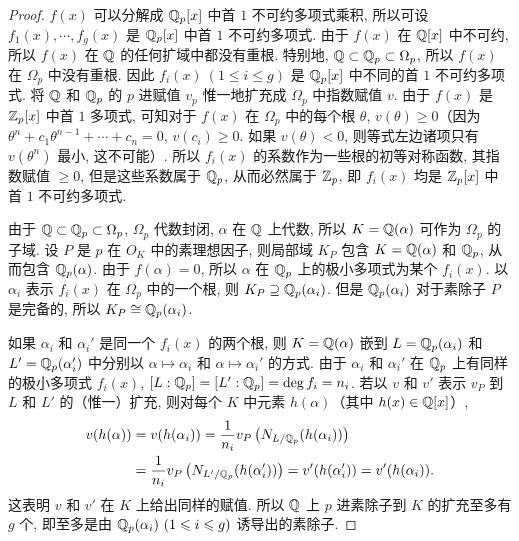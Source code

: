 \begin{proof}
$f(x)$ 可以分解成 $\mathbb{Q}_p[x]$ 中首 $1$ 不可约多项式乘积, 所以可设 $f_1(x),\cdots,f_g(x)$ 是 $\mathbb{Q}_p[x]$ 中首 $1$ 不可约多项式. 由于 $f(x)$ 在 $\mathbb{Q}[x]$ 中不可约, 所以 $f(x)$ 在 $\mathbb{Q}$ 的任何扩域中都没有重根. 特别地, $\mathbb{Q}\subset\mathbb{Q}_p\subset\Omega_p$, 所以 $f(x)$ 在 $\Omega_p$ 中没有重根. 因此 $f_i(x)\ (1\leqslant i\leqslant g)$ 是 $\mathbb{Q}_p[x]$ 中不同的首 $1$ 不可约多项式. 将 $\mathbb{Q}$ 和 $\mathbb{Q}_p$ 的 $p$ 进赋值 $v_p$ 惟一地扩充成 $\Omega_p$ 中指数赋值 $v$. 由于 $f(x)$ 是 $\mathbb{Z}_p[x]$ 中首 $1$ 多项式, 可知对于 $f(x)$ 在 $\Omega_p$ 中的每个根 $\theta$, $v(\theta)\geqslant 0$（因为 $\theta^n+c_1\theta^{n-1}+\cdots+c_n=0$, $v(c_i)\geqslant 0$. 如果 $v(\theta)<0$, 则等式左边诸项只有 $v(\theta^n)$ 最小, 这不可能）. 所以 $f_i(x)$ 的系数作为一些根的初等对称函数, 其指数赋值 $\geqslant 0$, 但是这些系数属于 $\mathbb{Q}_p$, 从而必然属于 $\mathbb{Z}_p$, 即 $f_i(x)$ 均是 $\mathbb{Z}_p[x]$ 中首 $1$ 不可约多项式.

由于 $\mathbb{Q}\subset\mathbb{Q}_p\subset\Omega_p$, $\Omega_p$ 代数封闭, $\alpha$ 在 $\mathbb{Q}$ 上代数, 所以 $K=\mathbb{Q}(\alpha)$ 可作为 $\Omega_p$ 的子域. 设 $P$ 是 $p$ 在 $O_K$ 中的素理想因子, 则局部域 $K_P$ 包含 $K=\mathbb{Q}(\alpha)$ 和 $\mathbb{Q}_p$, 从而包含 $\mathbb{Q}_p(\alpha)$. 由于 $f(\alpha)=0$, 所以 $\alpha$ 在 $\mathbb{Q}_p$ 上的极小多项式为某个 $f_i(x)$. 以 $\alpha_i$ 表示 $f_i(x)$ 在 $\Omega_p$ 中的一个根, 则 $K_P\supseteq\mathbb{Q}_p(\alpha_i)$. 但是 $\mathbb{Q}_p(\alpha_i)$ 对于素除子 $P$ 是完备的, 所以 $K_P\cong\mathbb{Q}_p(\alpha_i)$.

如果 $\alpha_i$ 和 $\alpha_i'$ 是同一个 $f_i(x)$ 的两个根, 则 $K=\mathbb{Q}(\alpha)$ 嵌到 $L=\mathbb{Q}_p(\alpha_i)$ 和 $L'=\mathbb{Q}_p(\alpha_i')$ 中分别以 $\alpha\mapsto\alpha_i$ 和 $\alpha\mapsto\alpha_i'$ 的方式. 由于 $\alpha_i$ 和 $\alpha_i'$ 在 $\mathbb{Q}_p$ 上有同样的极小多项式 $f_i(x)$, $[L:\mathbb{Q}_p]=[L':\mathbb{Q}_p]=\deg f_i=n_i$. 若以 $v$ 和 $v'$ 表示 $v_P$ 到 $L$ 和 $L'$ 的（惟一）扩充, 则对每个 $K$ 中元素 $h(\alpha)$（其中 $h(x)\in\mathbb{Q}[x]$）,
\begin{align*}
  v(h(\alpha))&=v(h(\alpha_i))=\frac{1}{n_i}v_P\left(N_{L/\mathbb{Q}_p}(h(\alpha_i))\right)\\
  &=\frac{1}{n_i}v_P\left(N_{L'/\mathbb{Q}_p}(h(\alpha_i'))\right)
  =v'(h(\alpha_i'))=v'(h(\alpha_i)).
\end{align*}
这表明 $v$ 和 $v'$ 在 $K$ 上给出同样的赋值. 所以 $\mathbb{Q}$ 上 $p$ 进素除子到 $K$ 的扩充至多有 $g$ 个, 即至多是由 $\mathbb{Q}_p(\alpha_i)\ (1\leqslant i\leqslant g)$ 诱导出的素除子.


\end{proof}
